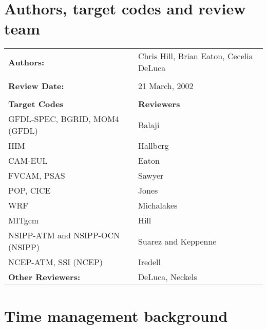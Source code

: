 \section{Authors, target codes and review team}

\begin{tabular}{l l}

{\bf Authors:} & Chris Hill, Brian Eaton, Cecelia DeLuca \\ \\

{\bf Review Date:}            & 21 March, 2002 \\ \\

{\bf Target Codes }           & {\bf Reviewers} \\
GFDL-SPEC, BGRID, MOM4 (GFDL) & Balaji \\ 
HIM                           & Hallberg \\
CAM-EUL                       & Eaton \\
FVCAM, PSAS                   & Sawyer \\
POP, CICE                     & Jones \\
WRF                           & Michalakes \\
MITgcm                        & Hill \\
NSIPP-ATM and NSIPP-OCN (NSIPP) & Suarez and Keppenne \\
NCEP-ATM, SSI (NCEP)          & Iredell \\ 

{\bf Other Reviewers:}        & DeLuca, Neckels

\end{tabular}


%

\section{Time management background}


%

